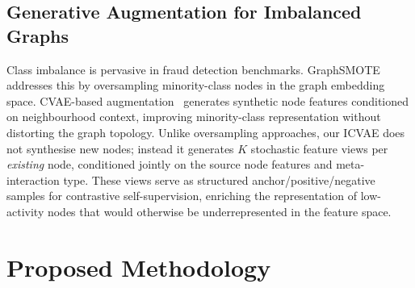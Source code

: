 \documentclass[conference]{IEEEtran}
\begin{document}
\subsection{Generative Augmentation for Imbalanced Graphs}
Class imbalance is pervasive in fraud detection benchmarks.
GraphSMOTE~\cite{zhao2021graphsmote} addresses this by oversampling
minority-class nodes in the graph embedding space.
CVAE-based augmentation~\cite{li2022graphvae} generates synthetic
node features conditioned on neighbourhood context, improving
minority-class representation without distorting the graph topology.
Unlike oversampling approaches, our ICVAE does not synthesise new
nodes; instead it generates $K$ stochastic feature views per
\emph{existing} node, conditioned jointly on the source node features
and meta-interaction type.  These views serve as structured
anchor/positive/negative samples for contrastive self-supervision,
enriching the representation of low-activity nodes that would
otherwise be underrepresented in the feature space.

\section{Proposed Methodology}
\label{sec:methodology}
\end{document}
